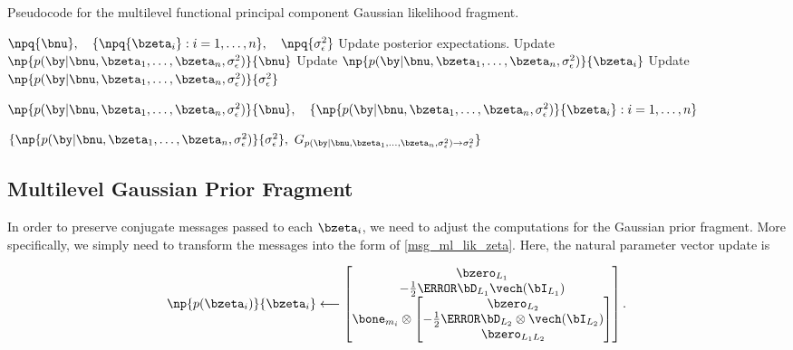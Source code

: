\documentclass[ba]{imsart}
\numberwithin{equation}{section}
\theoremstyle{plain}
\def\sigsqeps{\sigma^2_{\epsilon}}
\begin{document}
\begin{algorithm}
	\caption{
		Pseudocode for the multilevel functional principal component Gaussian likelihood fragment.
	}
	\label{alg:mlfpca_gauss_lik_frag}
	\begin{algorithmic}[1]
		\Inputs $
			\npq{\bnu}, \quad
			\{ \npq{\bzeta_i} : i = 1, \dots, n \}, \quad
			\npq{\sigsqeps}
		$
		\Updates
			\State Update posterior expectations.
			\State Update $\np{p (\by | \bnu, \bzeta_1, \dots, \bzeta_n, \sigsqeps)}{\bnu}$
				\State Update $\np{p (\by | \bnu, \bzeta_1, \dots, \bzeta_n, \sigsqeps)}{\bzeta_i}$
			\EndFor
			\State Update $\np{p (\by | \bnu, \bzeta_1, \dots, \bzeta_n, \sigsqeps)}{\sigsqeps}$
		\Outputs
			\begin{varwidth}[t]{\linewidth} $
				\np{p (\by | \bnu, \bzeta_1, \dots, \bzeta_n, \sigsqeps)}{\bnu}, \quad
				\{ \np{p (\by | \bnu, \bzeta_1, \dots, \bzeta_n, \sigsqeps)}{\bzeta_i} : i = 1, \dots, n \}
			$\par$
				\{
					\np{p (\by | \bnu, \bzeta_1, \dots, \bzeta_n, \sigsqeps)}{\sigsqeps}, \
					G_{p (\by | \bnu, \bzeta_1, \dots, \bzeta_n, \sigsqeps) \rightarrow \sigsqeps}
				\}
			$ \end{varwidth}
	\end{algorithmic}
\end{algorithm}


\subsection{Multilevel Gaussian Prior Fragment}
\label{sec:mlfpc_gauss_prior_frag}

In order to preserve conjugate messages passed to each $\bzeta_i$, we need to adjust the computations
for the Gaussian prior fragment. More specifically, we simply need to transform the messages into
the form of \eqref{msg_ml_lik_zeta}. Here, the natural parameter vector update is

\begin{equation}
	\np{p (\bzeta_i)}{\bzeta_i}
		\longleftarrow
			\begin{bmatrix}
				\bzero_{L_1} \\
				-\frac12 \T{\bD_{L_1}} \vech (\bI_{L_1}) \\
				\bone_{m_i} \otimes \begin{bmatrix}
					\bzero_{L_2} \\
					-\frac12 \T{\bD_{L_2}} \otimes \vech (\bI_{L_2}) \\
					\bzero_{L_1 L_2}
				\end{bmatrix}
			\end{bmatrix}.
\label{np_ml_gauss_prior}
\end{equation}
\end{document}
